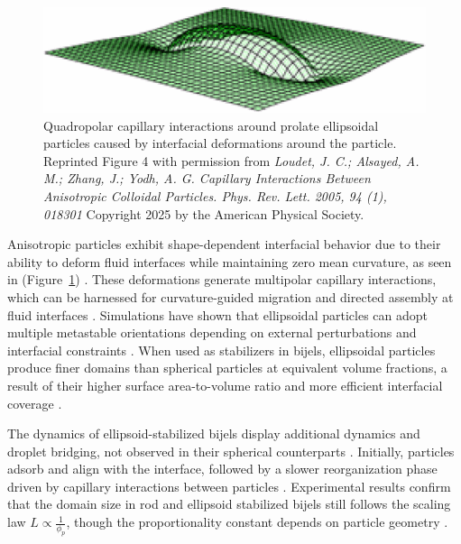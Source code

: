 \begin{figure}
    \centering
    \includegraphics[scale = 0.5]{figures/literature_review/interfacial_curvature.png}
    \caption{Quadropolar capillary interactions around prolate ellipsoidal particles caused by interfacial deformations 
             around the particle. Reprinted Figure 4 with permission from
             \textit{Loudet, J. C.; Alsayed, A. M.; Zhang, J.; Yodh, A. G. Capillary Interactions Between Anisotropic Colloidal Particles. Phys. Rev. Lett. 2005, 94 (1), 018301}
             Copyright 2025 by the American Physical Society.}
    \label{fig:anisotropic_particle_interface}
\end{figure}

Anisotropic particles exhibit shape-dependent interfacial behavior due to their ability to deform fluid interfaces while maintaining zero mean curvature, as seen in 
(Figure~\ref{fig:anisotropic_particle_interface}) \cite{loudet_capillary_2005, cheng_shape-anisotropic_2013}. These deformations generate multipolar capillary interactions, which can be harnessed 
for curvature-guided migration and directed assembly at fluid interfaces \cite{cavallaro_curvature-driven_2011, read_dimerization_2020, sharifi-mood_curvature_2015}. Simulations have shown that 
ellipsoidal particles can adopt multiple metastable orientations depending on external perturbations and interfacial constraints \cite{gunther_lattice_2013}. When used as stabilizers in bijels, 
ellipsoidal particles produce finer domains than spherical particles at equivalent volume fractions, a result of their higher surface area-to-volume ratio and more efficient interfacial coverage 
\cite{gunther_timescales_2014}.

The dynamics of ellipsoid-stabilized bijels display additional dynamics and droplet bridging, not observed in their spherical counterparts \cite{gunther_timescales_2014, witt_bijel_2013}. Initially, 
particles adsorb and align with the interface, followed by a slower reorganization phase driven by capillary interactions between particles \cite{gunther_timescales_2014}. Experimental results 
confirm that the domain size in rod and ellipsoid stabilized bijels still follows the scaling law $L \propto \frac{1}{\phi_p}$, though the proportionality constant depends on particle geometry 
\cite{hijnen_bijels_2015, madivala_exploiting_2009, daware_emulsions_2015}.

